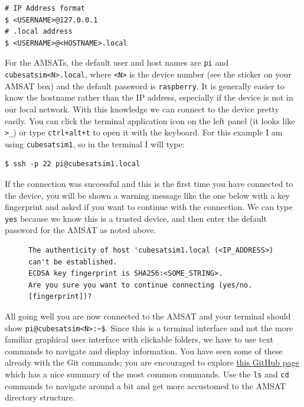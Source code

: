 \documentclass{tufte-book}
\begin{document}
\begin{lstlisting}[backgroundcolor=\color{lightgray}]
# IP Address format
$ <USERNAME>@127.0.0.1
# .local address
$ <USERNAME>@<HOSTNAME>.local
\end{lstlisting}

For the AMSATs, the default user and host names are \verb|pi| and \verb|cubesatsim<N>.local|, where \verb|<N>| is the device number (see the sticker on your AMSAT box) and the default password is \verb|raspberry|. It is generally easier to know the hostname rather than the IP address, especially if the device is not in our local network. With this knowledge we can connect to the device pretty easily. You can click the terminal application icon on the left panel (it looks like \verb|>_|) or type \verb|ctrl+alt+t| to open it with the keyboard. For this example I am using \verb|cubesatsim1|, so in the terminal I will type:

\begin{lstlisting}[backgroundcolor=\color{lightgray}]
$ ssh -p 22 pi@cubesatsim1.local
\end{lstlisting}

If the connection was successful and this is the first time you have connected to the device, you will be shown a warning message like the one below with a key fingerprint and asked if you want to continue with the connection. We can type \verb|yes| because we know this is a trusted device, and then enter the default password for the AMSAT as noted above.

\begin{figure}[h]
\begin{lstlisting}[backgroundcolor=\color{lightgray}, breaklines=true]
The authenticity of host 'cubesatsim1.local (<IP_ADDRESS>) can't be established.
ECDSA key fingerprint is SHA256:<SOME_STRING>.
Are you sure you want to continue connecting (yes/no.[fingerprint])?
\end{lstlisting}
\end{figure}




All going well you are now connected to the AMSAT and your terminal should show \verb|pi@cubesatsim<N>:~$|. Since this is a terminal interface and not the more familiar graphical user interface with clickable folders, we have to use text commands to navigate and display information. You have seen some of these already with the Git commands; you are encouraged to explore \href{https://gist.github.com/bradtraversy/cc180de0edee05075a6139e42d5f28ce}{this GitHub page} which has a nice summary of the most common commands. Use the \verb|ls| and \verb|cd| commands to navigate around a bit and get more accustomed to the AMSAT directory structure.
\end{document}
